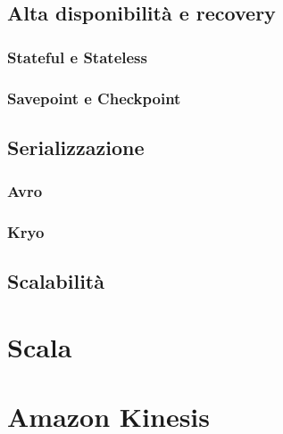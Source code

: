 \subsection{Alta disponibilità e recovery}

\subsubsection{Stateful e Stateless}

\subsubsection{Savepoint e Checkpoint}

\subsection{Serializzazione}

\subsubsection{Avro}

\subsubsection{Kryo}


\subsection{Scalabilità}


\section{Scala}

\section{Amazon Kinesis}


